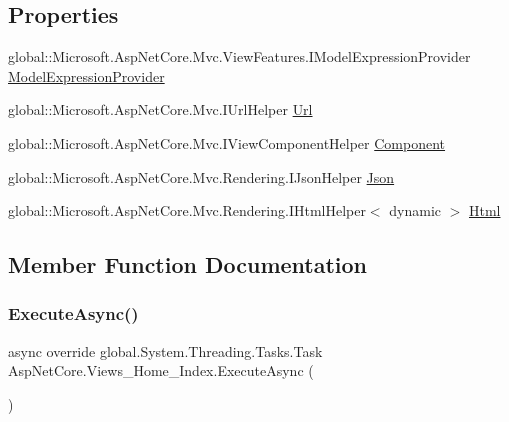 \subsection*{Properties}
\begin{DoxyCompactItemize}
\item 
global\+::\+Microsoft.\+Asp\+Net\+Core.\+Mvc.\+View\+Features.\+I\+Model\+Expression\+Provider \mbox{\hyperlink{class_asp_net_core_1_1_views___home___index_a1c12fddbab3a154a62b2a730eee55181}{Model\+Expression\+Provider}}
\item 
global\+::\+Microsoft.\+Asp\+Net\+Core.\+Mvc.\+I\+Url\+Helper \mbox{\hyperlink{class_asp_net_core_1_1_views___home___index_a49920e11fc6a3866a9362b0760f02473}{Url}}
\item 
global\+::\+Microsoft.\+Asp\+Net\+Core.\+Mvc.\+I\+View\+Component\+Helper \mbox{\hyperlink{class_asp_net_core_1_1_views___home___index_adb326987c09e7039ba39bfd6ddc92fb5}{Component}}
\item 
global\+::\+Microsoft.\+Asp\+Net\+Core.\+Mvc.\+Rendering.\+I\+Json\+Helper \mbox{\hyperlink{class_asp_net_core_1_1_views___home___index_aef8cb8ae3a2a3dc735b580b6a6c0176d}{Json}}
\item 
global\+::\+Microsoft.\+Asp\+Net\+Core.\+Mvc.\+Rendering.\+I\+Html\+Helper$<$ dynamic $>$ \mbox{\hyperlink{class_asp_net_core_1_1_views___home___index_aafaaf261e7ac319bee91aa0f369c4f72}{Html}}
\end{DoxyCompactItemize}


\subsection{Member Function Documentation}
\mbox{\label{class_asp_net_core_1_1_views___home___index_a2e2b2029628bc7b5b597c00591249147}} 
\subsubsection{\texorpdfstring{ExecuteAsync()}{ExecuteAsync()}}
{\footnotesize\ttfamily async override global.\+System.\+Threading.\+Tasks.\+Task Asp\+Net\+Core.\+Views\+\_\+\+Home\+\_\+\+Index.\+Execute\+Async (\begin{DoxyParamCaption}{ }\end{DoxyParamCaption})}




